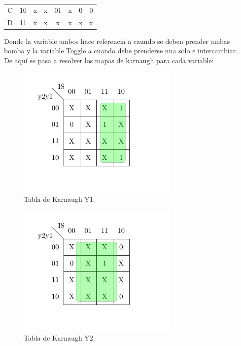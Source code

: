 \begin{table}[H]
\begin{tabular}{|cc|cccc|cc|}
\multicolumn{1}{|c|}{C} & 10                    & x                                                         & x                                                         & 01                                                                             & x                                                         & 0                & 0                 \\ \cline{1-1}
\multicolumn{1}{|c|}{D} & 11                    & x                                                         & x                                                         & x                                                                              & x                                                         & x                & x                 \\ \hline
\end{tabular}
\end{table}
Donde la variable ambos hace referencia a caundo se deben prender ambas bomba y la variable Toggle a cuando debe prenderse una solo e intercambiar.\\
De aquí se pasa a resolver los mapas de karnaugh para cada variable:\\
 \begin{figure}[H]
	\centering
	\includegraphics[width=0.7\textwidth]{ImagenesEjercicio1/Mapa1.pdf}
	\caption{Tabla de Karnaugh Y1.}
	\label{fig:fsm}
\end{figure}

 \begin{figure}[H]
	\centering
	\includegraphics[width=0.7\textwidth]{ImagenesEjercicio1/Mapa2.pdf}
	\caption{Tabla de Karnaugh Y2.}
	\label{fig:fsm}
\end{figure}

